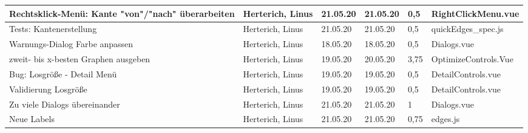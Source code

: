 \begin{longtable}{|p{4cm}|p{2cm}|p{1.2cm}|p{1.2cm}|p{0.7cm}|p{3.8cm}|}
  Rechtsklick-Menü: Kante "von"/"nach" überarbeiten                     & Herterich, Linus      & 21.05.20 & 21.05.20 & 0,5   & RightClickMenu.vue                                          \\ \hline
  Tests: Kantenerstellung                                               & Herterich, Linus      & 21.05.20 & 21.05.20 & 0,5   & quickEdges\_spec.js                                          \\ \hline
  Warnungs-Dialog Farbe anpassen                                        & Herterich, Linus      & 18.05.20 & 18.05.20 & 0,5   & Dialogs.vue                                                 \\ \hline
  zweit- bis x-besten Graphen ausgeben                                  & Herterich, Linus      & 19.05.20 & 20.05.20 & 3,75  & OptimizeControls.Vue                                        \\ \hline
  Bug: Losgröße - Detail Menü                                           & Herterich, Linus      & 19.05.20 & 19.05.20 & 0,5   & DetailControls.vue                                          \\ \hline
  Validierung Losgröße                                                  & Herterich, Linus      & 19.05.20 & 19.05.20 & 0,5   & DetailControls.vue                                          \\ \hline
  Zu viele Dialogs übereinander                                         & Herterich, Linus      & 21.05.20 & 21.05.20 & 1     & Dialogs.vue                                                 \\ \hline
  Neue Labels                                                           & Herterich, Linus      & 21.05.20 & 21.05.20 & 0,75  & edges.js                                                    \\ \hline


\end{longtable}
